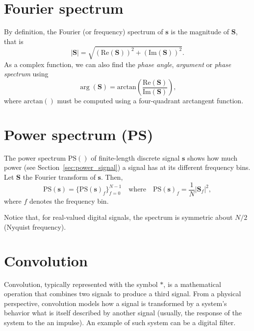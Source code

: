 
\section{Fourier spectrum}
\label{sec:Fourier_spectrum}

By definition, the Fourier
(or frequency) spectrum of $\mathbf{s}$ is the magnitude of
$\mathbf{S}$, that is
\begin{equation}
  |\mathbf{S}| = \sqrt{(\text{Re}(\mathbf{S}))^2+(\text{Im}(\mathbf{S}))^2}.
\end{equation}
As a complex function, we can also find the \emph{phase angle}, \emph{argument} or
\emph{phase spectrum} using
\begin{equation}
  \arg({\mathbf{S}}) = \text{arctan}\left(\frac{\text{Re}(\mathbf{S})}{\text{Im}(\mathbf{S})}\right),
\end{equation}
where $\text{arctan}()$ must be computed using a four-quadrant
arctangent function.


\section{Power spectrum (PS)}
\label{sec:power_spectrum}

The power spectrum $\text{PS}()$ of finite-length discrete signal
$\mathbf{s}$ shows how much power (see Section~\ref{sec:power_signal})
a signal has at its different frequency bins. Let $\mathbf{S}$ the
Fourier transform of $\mathbf{s}$. Then,
\begin{equation}
  \text{PS}(\mathbf{s}) = \{\text{PS}(\mathbf{s})_f\}_{f=0}^{N-1} \quad \text{where} \quad \text{PS}(\mathbf{s})_f = \frac{1}{N}|\mathbf{S}_f|^2,
\end{equation}
where $f$ denotes the frequency bin.

Notice that, for real-valued digital signals, the spectrum is
symmetric about $N/2$ (Nyquist frequency).


\section{Convolution}
\label{sec:convolution}

Convolution, typically represented with the symbol $\ast$, is a
mathematical operation that combines two signals to produce a third
signal. From a physical perspective, convolution models how a signal
is transformed by a system's behavior what is itself described by
another signal (usually, the response of the system to the an
impulse). An example of such system can be a digital filter.

